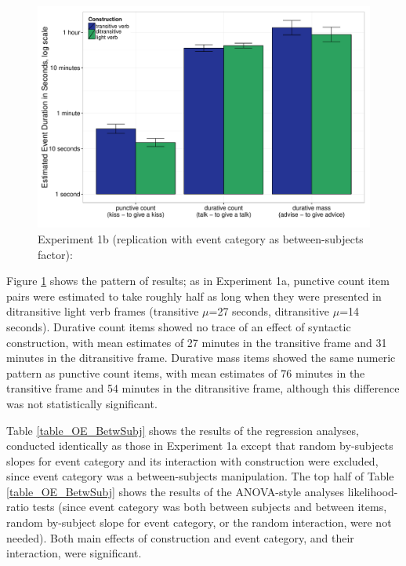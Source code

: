 \documentclass[preprint,12pt,authoryear]{elsarticle}
\begin{document}
\begin{figure}[ht!]
\centering
\includegraphics[width=\textwidth]{./Figures/Exp1b_AllEventsBar.pdf}
\caption{Experiment 1b (replication with event category as between-subjects factor): }
\label{fig_resOE1b}
\end{figure}

Figure \ref{fig_resOE1b} shows the pattern of results; as in Experiment 1a, punctive count item pairs were estimated to take roughly half as long when they were presented in ditransitive light verb frames (transitive  $\mu$=27 seconds, ditransitive $\mu$=14 seconds). Durative count items showed no trace of an effect of syntactic construction, with mean estimates of 27 minutes in the transitive frame and 31 minutes in the ditransitive frame. Durative mass items showed the same numeric pattern as punctive count items, with mean estimates of 76 minutes in the transitive frame and 54 minutes in the ditransitive frame, although this difference was not statistically significant.

Table \ref{table_OE_BetwSubj} shows the results of the regression analyses, conducted identically as those in Experiment 1a except that random by-subjects slopes for event category and its interaction with construction were excluded, since event category was a between-subjects manipulation. The top half of Table \ref{table_OE_BetwSubj} shows the results of the ANOVA-style analyses likelihood-ratio tests (since event category was both between subjects and between items, random by-subject slope for event category, or the random interaction, were not needed). Both main effects of construction and event category, and their interaction, were significant.
\end{document}

